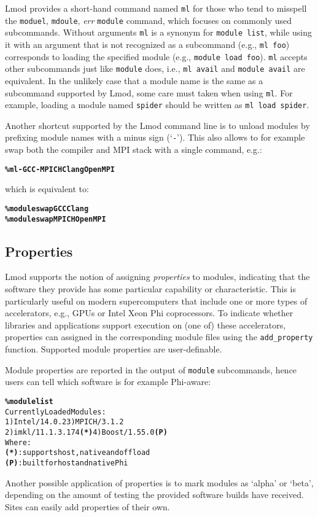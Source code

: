 Lmod provides a short-hand command named \texttt{\small ml} for those who tend to
misspell the \texttt{\small moduel}, \texttt{\small mdoule}, \emph{err}
\texttt{\small module} command, which focuses on
commonly used subcommands. Without arguments \texttt{\small ml} is a synonym for
\texttt{\small module list}, while using it with an argument that is not
recognized as a subcommand (e.g., \texttt{\small ml foo}) corresponds to loading
the specified module (e.g., \texttt{\small module load foo}).
\texttt{\small ml} accepts other subcommands just like \texttt{\small module} does,
i.e., \texttt{\small ml avail} and \texttt{\small module avail} are equivalent.
In the unlikely case that a module name is the same as a subcommand supported by Lmod, 
some care must taken when using \texttt{\small ml}. For example, loading a module
named \texttt{\small spider} should be written as \texttt{\small ml load spider}.

Another shortcut supported by the Lmod command line is to unload modules by
prefixing module names with a minus sign (`\texttt{\small-}'). This also allows to
for example swap both the compiler and MPI stack with a single command, e.g.:
{\small
  \begin{alltt}
      \textbf{\% ml -GCC -MPICH Clang OpenMPI}\
  \end{alltt}
}
\noindent
which is equivalent to:{\small
  \begin{alltt}
      \textbf{\% module swap GCC Clang}
      \textbf{\% module swap MPICH OpenMPI}\
  \end{alltt}
}

\subsection{Properties}

Lmod supports the notion of assigning \emph{properties} to modules,
indicating that the software they provide has some particular capability or
characteristic. This is particularly useful on modern supercomputers that include
one or more types of accelerators, e.g., GPUs or Intel Xeon Phi coprocessors.
To indicate whether libraries and applications support execution on (one of) these
accelerators, properties can assigned in the corresponding module files
using the \texttt{\small add\_property} function. Supported module
properties are user-definable.

Module properties are reported in the output of \texttt{\small module} subcommands,
hence users can tell which software is for example Phi-aware:
{\small
\begin{alltt}
  \textbf{\% module list}
  Currently Loaded Modules:
    1) Intel/14.0.2        3) MPICH/3.1.2
    2) imkl/11.1.3.174 \textbf{(*)} 4) Boost/1.55.0 \textbf{(P)}
  Where:
   \textbf{(*)}:  supports host, native and offload
   \textbf{(P)}:  built for host and native Phi
\end{alltt}
}
\noindent Another possible application of properties is to mark modules as `alpha'
or `beta', depending on the amount of testing the provided software builds have
received. Sites can easily add properties of their own.

